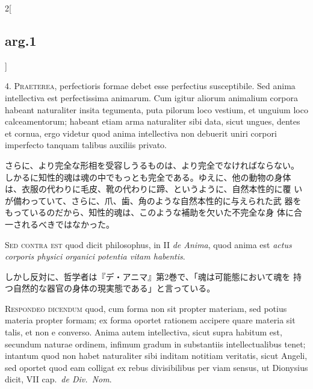 \documentclass[paper=a4paper,fontsize=10pt,jafontsize=9pt,titlepage]{jlreq}
\begin{document}
\begin{paracol}{2}[\subsection{arg.1}]




4. {\scshape Praeterea}, perfectioris formae debet esse perfectius
susceptibile. Sed anima intellectiva est perfectissima animarum. Cum
igitur aliorum animalium corpora habeant naturaliter insita tegumenta,
puta pilorum loco vestium, et unguium loco calceamentorum; habeant
etiam arma naturaliter sibi data, sicut ungues, dentes et cornua, ergo
videtur quod anima intellectiva non debuerit uniri corpori imperfecto
tanquam talibus auxiliis privato.
 
\switchcolumn

 さらに、より完全な形相を受容しうるものは、より完全でなければならない。
 しかるに知性的魂は魂の中でもっとも完全である。ゆえに、他の動物の身体
 は、衣服の代わりに毛皮、靴の代わりに蹄、というように、自然本性的に覆
 いが備わっていて、さらに、爪、歯、角のような自然本性的に与えられた武
 器をもっているのだから、知性的魂は、このような補助を欠いた不完全な身
 体に合一されるべきではなかった。


 \switchcolumn*[\subsection{s.c.}]

 {\scshape Sed contra est} quod dicit philosophus, in II {\itshape de
 Anima}, quod anima est {\itshape actus corporis physici organici
 potentia vitam habentis}.
 
\switchcolumn

 しかし反対に、哲学者は『デ・アニマ』第2巻で、「魂は可能態において魂を
 持つ自然的な器官の身体の現実態である」と言っている。
 


 {\scshape Respondeo dicendum} quod, cum forma non sit propter
 materiam, sed potius materia propter formam; ex forma oportet
 rationem accipere quare materia sit talis, et non e converso. Anima
 autem intellectiva, sicut supra habitum est, secundum naturae
 ordinem, infimum gradum in substantiis intellectualibus tenet;
 intantum quod non habet naturaliter sibi inditam notitiam veritatis,
 sicut Angeli, sed oportet quod eam colligat ex rebus divisibilibus
 per viam sensus, ut Dionysius dicit, VII cap.~{\itshape de Div.~Nom}.



\end{paracol}
\end{document}
